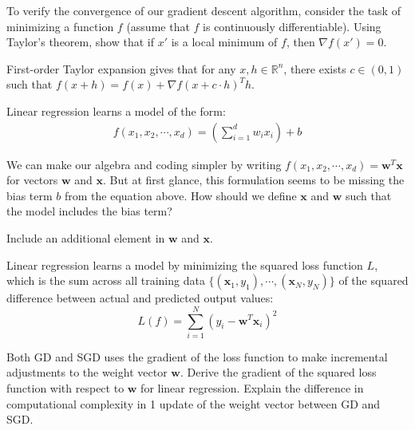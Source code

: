 \begin{problem}[3]
    To verify the convergence of our gradient descent algorithm, consider the task of minimizing a function $f$ (assume that $f$ is continuously differentiable). Using Taylor's theorem, show that if $x'$ is a local minimum of $f$, then $\nabla f(x') = 0$. 
\end{problem}
\begin{hint}
  First-order Taylor expansion gives that for any $x, h \in \mathbb{R}^n$, there exists $c \in (0, 1)$ such that $f(x + h) = f(x) + \nabla f(x + c\cdot h)^T h$.
  
\end{hint}
\begin{solution}

\end{solution}

Linear regression learns a model of the form:
\begin{align*}
  f(x_1, x_2, \cdots, x_d) = \left(\sum_{i=1}^d w_i x_i\right) + b
\end{align*}

\begin{problem}[1]
  We can make our algebra and coding simpler by writing $f(x_1, x_2, \cdots, x_d) = \mathbf{w}^T\mathbf{x}$ for vectors $\mathbf{w}$ and $\mathbf{x}$.  But at first glance, this formulation seems to be missing the bias term $b$ from the equation above.  How should we define $\mathbf{x}$ and $\mathbf{w}$ such that the model includes the bias term?
\end{problem}
\begin{hint}
  Include an additional element in $\mathbf{w}$ and $\mathbf{x}$.
\end{hint}
\begin{solution}
  
\end{solution}

Linear regression learns a model by minimizing the squared loss function $L$, which is the sum across all training data $\{(\mathbf{x}_1, y_1),\cdots,(\mathbf{x}_N, y_N)\}$ of the squared difference between actual and predicted output values:
\[L(f) = \sum_{i=1}^N (y_i - \mathbf{w}^T\mathbf{x}_i)^2\]

\begin{problem}[2]
  Both GD and SGD uses the gradient of the loss function to make incremental adjustments to the weight vector $\mathbf{w}$. Derive the gradient of the squared loss function with respect to $\mathbf{w}$ for linear regression. Explain the difference in computational complexity in 1 update of the weight vector between GD and SGD. 
\end{problem}
\begin{solution}
  
\end{solution}

